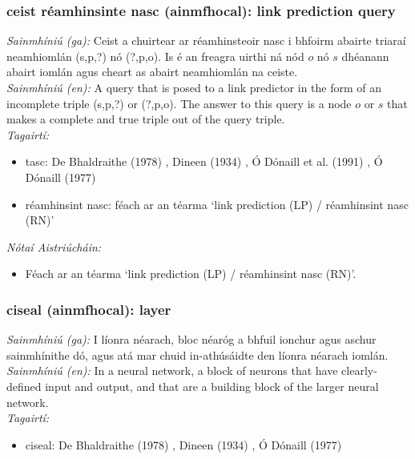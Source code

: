 \subsubsection*{ceist réamhinsinte nasc (ainmfhocal): link prediction query}
 \noindent \textit{Sainmhíniú (ga):} Ceist a chuirtear ar réamhinsteoir nasc i bhfoirm abairte triaraí neamhiomlán (s,p,?) nó (?,p,o). Is é an freagra uirthi ná nód $o$ nó $s$ dhéanann abairt iomlán agus cheart as abairt neamhiomlán na ceiste.
\\
 \noindent \textit{Sainmhíniú (en):} A query that is posed to a link predictor in the form of an incomplete triple (s,p,?) or (?,p,o). The answer to this query is a node $o$ or $s$ that makes a complete and true triple out of the query triple.
\\
 \noindent \textit{Tagairtí:}
\begin{itemize}
	\item tasc: De Bhaldraithe (1978) \cite{de-bhaldraithe}, Dineen (1934) \cite{dineen}, Ó Dónaill et al. (1991) \cite{focloir-beag}, Ó Dónaill (1977) \cite{odonaill}
	\item réamhinsint nasc: féach ar an téarma `link prediction (LP) / réamhinsint nasc (RN)'
\end{itemize}

 \noindent \textit{Nótaí Aistriúcháin:}
\begin{itemize}
	\item Féach ar an téarma `link prediction (LP) / réamhinsint nasc (RN)'.
\end{itemize}


\subsubsection*{ciseal (ainmfhocal): layer}
 \noindent \textit{Sainmhíniú (ga):} I líonra néarach, bloc néaróg a bhfuil ionchur agus aschur sainmhínithe dó, agus atá mar chuid in-athúsáidte den líonra néarach iomlán.
\\
 \noindent \textit{Sainmhíniú (en):} In a neural network, a block of neurons that have clearly-defined input and output, and that are a building block of the larger neural network.
\\
 \noindent \textit{Tagairtí:}
\begin{itemize}
	\item ciseal: De Bhaldraithe (1978) \cite{de-bhaldraithe}, Dineen (1934) \cite{dineen}, Ó Dónaill (1977) \cite{odonaill}
\end{itemize}

